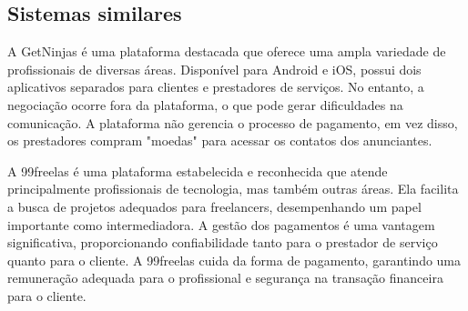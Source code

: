 

\subsection{Sistemas similares}
A GetNinjas é uma plataforma destacada que oferece uma ampla variedade de profissionais de diversas
áreas. Disponível para Android e iOS, possui dois aplicativos separados para clientes e 
prestadores de serviços. No entanto, a negociação ocorre fora da plataforma, o que pode gerar 
dificuldades na comunicação. A plataforma não gerencia o processo de pagamento, em vez disso, os
prestadores compram "moedas" para acessar os contatos dos anunciantes.

A 99freelas é uma plataforma estabelecida e reconhecida que atende principalmente profissionais de 
tecnologia, mas também outras áreas. Ela facilita a busca de projetos adequados para freelancers,
desempenhando um papel importante como intermediadora. A gestão dos pagamentos é uma vantagem 
significativa, proporcionando confiabilidade tanto para o prestador de serviço quanto para o 
cliente. A 99freelas cuida da forma de pagamento, garantindo uma remuneração adequada para o 
profissional e segurança na transação financeira para o cliente.

